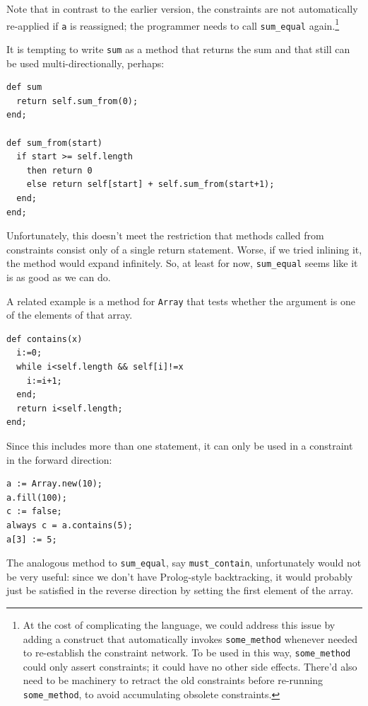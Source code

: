 \documentclass{article}
\begin{document}
Note that in contrast to the earlier version, the constraints are not
automatically re-applied if \verb|a| is reassigned; the programmer
needs to call \verb|sum_equal| again.\footnote{At the cost of
  complicating the language, we could address this issue by adding a
  construct that automatically invokes \texttt{some\_method} whenever
  needed to re-establish the constraint network.  To be used in this
  way, \texttt{some\_method} could only assert constraints; it could
  have no other side effects.  There'd also need to be machinery to
  retract the old constraints before re-running \texttt{some\_method},
  to avoid accumulating obsolete constraints.}

It is tempting to write \verb|sum| as a method that returns the sum
and that still can be used multi-directionally, perhaps:

\begin{verbatim}
def sum
  return self.sum_from(0);
end;

def sum_from(start)
  if start >= self.length
    then return 0
    else return self[start] + self.sum_from(start+1);
  end;
end;
\end{verbatim}

Unfortunately, this doesn't meet the restriction that methods called
from constraints consist only of a single return statement.  Worse, if
we tried inlining it, the method would expand infinitely.  So, at
least for now, \verb|sum_equal| seems like it is as good as we can do.

A related example is a method for \verb|Array| that tests whether the
argument is one of the elements of that array.

\begin{verbatim}
def contains(x)
  i:=0;
  while i<self.length && self[i]!=x
    i:=i+1;
  end;
  return i<self.length;
end;
\end{verbatim}

Since this includes more than one statement, it can only be used in
a constraint in the forward direction:
\begin{verbatim}
a := Array.new(10);
a.fill(100);
c := false;
always c = a.contains(5);
a[3] := 5;
\end{verbatim}

The analogous method to \verb|sum_equal|, say \verb|must_contain|,
unfortunately would not be very useful: since we don't have
Prolog-style backtracking, it would probably just be satisfied in the
reverse direction by setting the first element of the array.
\end{document}
